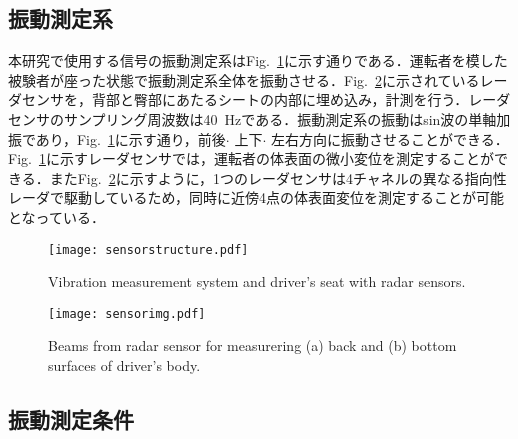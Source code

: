 \documentclass[a4j]{jsarticle}
\begin{document}
\subsection{振動測定系}

本研究で使用する信号の振動測定系はFig.~\ref{fig:sensorstructure}に示す通りである．運転者を模した被験者が座った状態で振動測定系全体を振動させる．Fig.~\ref{fig:sensorimg}に示されているレーダセンサを，背部と臀部にあたるシートの内部に埋め込み，計測を行う．レーダセンサのサンプリング周波数は40~Hzである．振動測定系の振動はsin波の単軸加振であり，Fig.~\ref{fig:sensorstructure}に示す通り，前後$\cdot$ 上下$\cdot$ 左右方向に振動させることができる．
Fig.~\ref{fig:sensorstructure}に示すレーダセンサでは，運転者の体表面の微小変位を測定することができる．またFig.~\ref{fig:sensorimg}に示すように，1つのレーダセンサは4チャネルの異なる指向性レーダで駆動しているため，同時に近傍4点の体表面変位を測定することが可能となっている．

\begin{figure}[tb]
  \centering
  \vspace{0pt} %
  \texttt{[image: sensorstructure.pdf]}
  \vspace{0pt} %
  \caption{Vibration measurement system and driver's seat with radar sensors.}
  \vspace{-10pt} %
  \label{fig:sensorstructure}
\end{figure}

\begin{figure}[t]
  \centering
  \vspace{0pt} %
  \texttt{[image: sensorimg.pdf]}
  \vspace{0pt} %
  \caption{Beams from radar sensor for measurering (a) back and (b) bottom surfaces of driver's body.}
  \vspace{-20pt} %
  \label{fig:sensorimg}
\end{figure}

\subsection{振動測定条件}
\end{document}
